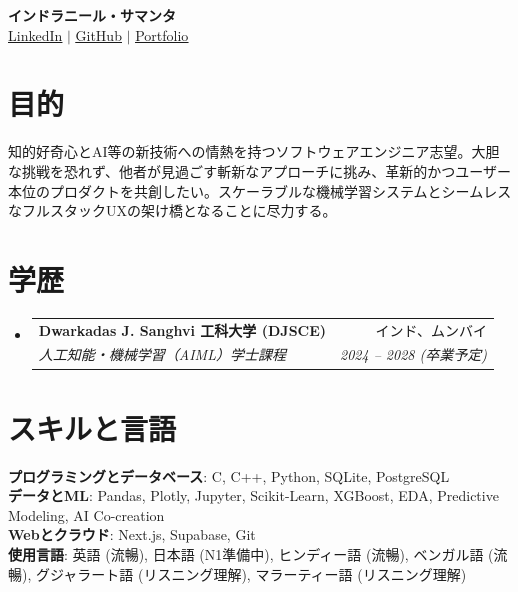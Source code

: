 \documentclass[letterpaper,10pt]{article}
\makeatletter
\newcommand{\resumeSubheading}[4]{
  \item
    \begin{tabular*}{0.98\textwidth}[t]{l@{\extracolsep{\fill}}r}
      \textbf{#1} & \small#2 \\
      \textit{\small#3} & \textit{\small #4} \\
    \end{tabular*}\vspace{2pt}
}
\newcommand{\resumeSubHeadingListStart}{\begin{itemize}[leftmargin=0.12in, label={}, itemsep=5pt, parsep=0pt, topsep=2pt]}
\newcommand{\resumeSubHeadingListEnd}{\end{itemize}}
\makeatother
\begin{document}
\begin{center}
    \textbf{\Huge \scshape インドラニール・サマンタ} \\ \vspace{6pt}
    \small \href{https://linkedin.com/in/indraneel-samanta}{\underline{LinkedIn}} $|$
    \href{https://github.com/NotCatfish}{\underline{GitHub}} $|$
    \href{https://indraneelsamanta.vercel.app/}{\underline{Portfolio}}
\end{center}

\section{目的}
  \small{知的好奇心とAI等の新技術への情熱を持つソフトウェアエンジニア志望。大胆な挑戦を恐れず、他者が見過ごす斬新なアプローチに挑み、革新的かつユーザー本位のプロダクトを共創したい。スケーラブルな機械学習システムとシームレスなフルスタックUXの架け橋となることに尽力する。}
\vspace{4pt}

\section{学歴}
  \resumeSubHeadingListStart
    \resumeSubheading
      {Dwarkadas J. Sanghvi 工科大学 (DJSCE)}{インド、ムンバイ}
      {人工知能・機械学習（AIML）学士課程}{2024 -- 2028 (卒業予定)}
  \resumeSubHeadingListEnd

\section{スキルと言語}
 \begin{itemize}[leftmargin=0.15in, label={}, itemsep=4pt, parsep=0pt, topsep=2pt]
    \small{\item{
     \textbf{プログラミングとデータベース}{: C, C++, Python, SQLite, PostgreSQL} \\[3pt]
     \textbf{データとML}{: Pandas, Plotly, Jupyter, Scikit-Learn, XGBoost, EDA, Predictive Modeling, AI Co-creation} \\[3pt]
     \textbf{Webとクラウド}{: Next.js, Supabase, Git} \\[3pt]
     \textbf{使用言語}{: 英語 (流暢), 日本語 (N1準備中), ヒンディー語 (流暢), ベンガル語 (流暢), グジャラート語 (リスニング理解), マラーティー語 (リスニング理解)}
    }}
 \end{itemize}
\end{document}
